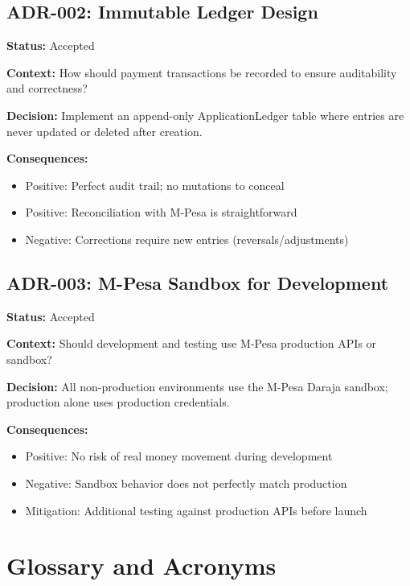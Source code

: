 \documentclass[12pt, a4paper, twoside, openright]{report}
\begin{document}
\section{ADR-002: Immutable Ledger Design}

\textbf{Status:} Accepted

\textbf{Context:} How should payment transactions be recorded to ensure auditability and correctness?

\textbf{Decision:} Implement an append-only ApplicationLedger table where entries are never updated or deleted after creation.

\textbf{Consequences:}
\begin{itemize}
    \item Positive: Perfect audit trail; no mutations to conceal
    \item Positive: Reconciliation with M-Pesa is straightforward
    \item Negative: Corrections require new entries (reversals/adjustments)
\end{itemize}

\section{ADR-003: M-Pesa Sandbox for Development}

\textbf{Status:} Accepted

\textbf{Context:} Should development and testing use M-Pesa production APIs or sandbox?

\textbf{Decision:} All non-production environments use the M-Pesa Daraja sandbox; production alone uses production credentials.

\textbf{Consequences:}
\begin{itemize}
    \item Positive: No risk of real money movement during development
    \item Negative: Sandbox behavior does not perfectly match production
    \item Mitigation: Additional testing against production APIs before launch
\end{itemize}

\chapter{Glossary and Acronyms}
\end{document}
